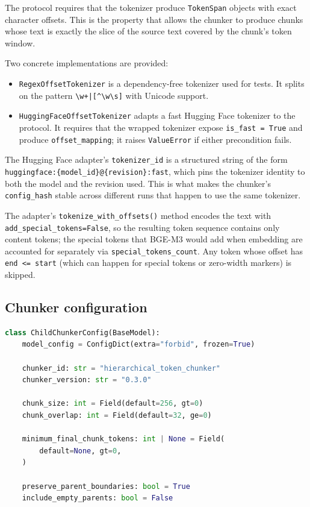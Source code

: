 \documentclass[11pt,a4paper]{article}
\begin{document}
The protocol requires that the tokenizer produce \texttt{TokenSpan}
objects with exact character offsets. This is the property that
allows the chunker to produce chunks whose text is exactly the slice
of the source text covered by the chunk's token window.

Two concrete implementations are provided:

\begin{itemize}[leftmargin=1.5em,itemsep=0.15em]
  \item \texttt{RegexOffsetTokenizer} is a dependency-free
    tokenizer used for tests. It splits on the pattern
    \texttt{\textbackslash w+|[^\textbackslash w\textbackslash s]}
    with Unicode support.
  \item \texttt{HuggingFaceOffsetTokenizer} adapts a fast Hugging
    Face tokenizer to the protocol. It requires that the wrapped
    tokenizer expose \texttt{is\_fast = True} and produce
    \texttt{offset\_mapping}; it raises \texttt{ValueError} if either
    precondition fails.
\end{itemize}

The Hugging Face adapter's \texttt{tokenizer\_id} is a structured
string of the form
\texttt{huggingface:\{model\_id\}@\{revision\}:fast}, which pins the
tokenizer identity to both the model and the revision used. This is
what makes the chunker's \texttt{config\_hash} stable across
different runs that happen to use the same tokenizer.

The adapter's \texttt{tokenize\_with\_offsets()} method encodes the
text with \texttt{add\_special\_tokens=False}, so the resulting token
sequence contains only content tokens; the special tokens that BGE-M3
would add when embedding are accounted for separately via
\texttt{special\_tokens\_count}. Any token whose offset has
\texttt{end <= start} (which can happen for special tokens or
zero-width markers) is skipped.

\subsection{Chunker configuration}
\begin{lstlisting}[language=python]
class ChildChunkerConfig(BaseModel):
    model_config = ConfigDict(extra="forbid", frozen=True)

    chunker_id: str = "hierarchical_token_chunker"
    chunker_version: str = "0.3.0"

    chunk_size: int = Field(default=256, gt=0)
    chunk_overlap: int = Field(default=32, ge=0)

    minimum_final_chunk_tokens: int | None = Field(
        default=None, gt=0,
    )

    preserve_parent_boundaries: bool = True
    include_empty_parents: bool = False
\end{lstlisting}
\end{document}
